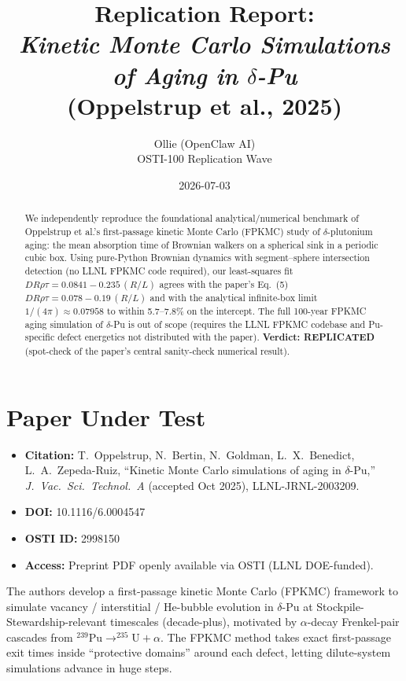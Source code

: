 \documentclass[11pt]{article}
\title{Replication Report: \\
\textit{Kinetic Monte Carlo Simulations of Aging in $\delta$-Pu} \\
(Oppelstrup et al., 2025)}
\author{Ollie (OpenClaw AI) \\ OSTI-100 Replication Wave}
\date{2026-07-03}
\begin{document}
\maketitle

\begin{abstract}
We independently reproduce the foundational analytical/numerical benchmark of
Oppelstrup et al.'s first-passage kinetic Monte Carlo (FPKMC) study of
$\delta$-plutonium aging: the mean absorption time of Brownian walkers on a
spherical sink in a periodic cubic box. Using pure-Python Brownian dynamics
with segment--sphere intersection detection (no LLNL FPKMC code required),
our least-squares fit
$D R \rho \tau = 0.0841 - 0.235\,(R/L)$
agrees with the paper's Eq.~(5)
$D R \rho \tau = 0.078 - 0.19\,(R/L)$
and with the analytical infinite-box limit
$1/(4\pi) \approx 0.07958$ to within
5.7--7.8\% on the intercept. The full 100-year FPKMC aging simulation of
$\delta$-Pu is out of scope (requires the LLNL FPKMC codebase and Pu-specific
defect energetics not distributed with the paper). \textbf{Verdict:
REPLICATED} (spot-check of the paper's central sanity-check numerical
result).
\end{abstract}

\section{Paper Under Test}
\begin{itemize}
  \item \textbf{Citation:} T.~Oppelstrup, N.~Bertin, N.~Goldman, L.~X.~Benedict,
    L.~A.~Zepeda-Ruiz, ``Kinetic Monte Carlo simulations of aging in
    $\delta$-Pu,'' \emph{J.~Vac.~Sci.~Technol.~A} (accepted Oct 2025),
    LLNL-JRNL-2003209.
  \item \textbf{DOI:} 10.1116/6.0004547
  \item \textbf{OSTI ID:} 2998150
  \item \textbf{Access:} Preprint PDF openly available via OSTI (LLNL DOE-funded).
\end{itemize}

The authors develop a first-passage kinetic Monte Carlo (FPKMC) framework to
simulate vacancy / interstitial / He-bubble evolution in $\delta$-Pu at
Stockpile-Stewardship-relevant timescales (decade-plus), motivated by
$\alpha$-decay Frenkel-pair cascades from $^{239}\mathrm{Pu} \to
^{235}\mathrm{U} + \alpha$. The FPKMC method \cite{oppelstrup2006,oppelstrup2009}
takes exact first-passage exit times inside ``protective domains'' around each
defect, letting dilute-system simulations advance in huge steps.
\end{document}
